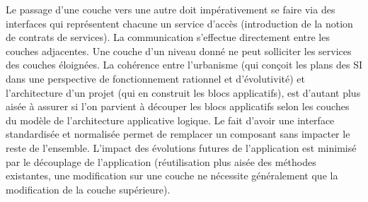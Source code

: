 \documentclass[12pt,a4paper]{article}
\begin{document}
Le passage d’une couche vers une autre doit impérativement se faire via des interfaces qui représentent chacune un service d’accès (introduction de la notion de contrats de services).
La communication s’effectue directement entre les couches adjacentes. Une couche d’un niveau donné ne peut solliciter les services des couches éloignées.
La cohérence entre l’urbanisme (qui conçoit les plans des SI dans une perspective de fonctionnement rationnel et d’évolutivité) et l’architecture d’un projet (qui en construit les blocs applicatifs), est d’autant plus aisée à assurer si l’on parvient à découper les blocs applicatifs selon les couches du modèle de l’architecture applicative logique.
Le fait d’avoir une interface standardisée et normalisée permet de remplacer un composant sans impacter le reste de l’ensemble.
L’impact des évolutions futures de l’application est minimisé par le découplage de l’application (réutilisation plus aisée des méthodes existantes, une modification sur une couche ne nécessite généralement que la modification de la couche supérieure).
\clearpage
\newpage
\end{document}
